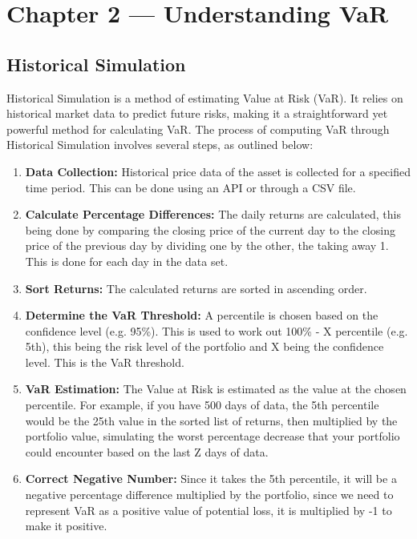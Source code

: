\documentclass{article}
\begin{document}
\section{Chapter 2 --- Understanding VaR}

\subsection{Historical Simulation}

Historical Simulation is a method of estimating Value at Risk (VaR). It relies on historical market data to predict future risks, making it a straightforward yet powerful method for calculating VaR. The process of computing VaR through Historical Simulation involves several steps, as outlined below:

\begin{enumerate}
    \item \textbf{Data Collection:} Historical price data of the asset is collected for a specified time period. This can be done using an API or through a CSV file.
    \item \textbf{Calculate Percentage Differences:} The daily returns are calculated, this being done by comparing the closing price of the current day to the closing price of the previous day by dividing one by the other, the taking away 1. This is done for each day in the data set.
    \item \textbf{Sort Returns:} The calculated returns are sorted in ascending order.
    \item \textbf{Determine the VaR Threshold:} A percentile is chosen based on the confidence level (e.g. 95\%). This is used to work out 100\% - X percentile (e.g. 5th), this being the risk level of the portfolio and X being the confidence level. This is the VaR threshold.
    \item \textbf{VaR Estimation:} The Value at Risk is estimated as the value at the chosen percentile. For example, if you have 500 days of data, the 5th percentile would be the 25th value in the sorted list of returns, then multiplied by the portfolio value, simulating the worst percentage decrease that your portfolio could encounter based on the last Z days of data.
    \item \textbf{Correct Negative Number:} Since it takes the 5th percentile, it will be a negative percentage difference multiplied by the portfolio, since we need to represent VaR as a positive value of potential loss, it is multiplied by -1 to make it positive.
\end{enumerate}
\end{document}
